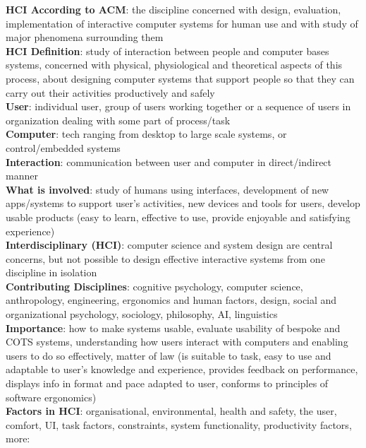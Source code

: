 \documentclass[a4paper]{article}
\begin{document}
    \scriptsize
    \begin{multicols}{2}
        \noindent\textbf{HCI According to ACM}: the discipline concerned with design, evaluation, implementation of interactive computer systems for human use and with study of major phenomena surrounding them\\
        \textbf{HCI Definition}: study of interaction between people and computer bases systems, concerned with physical, physiological and theoretical aspects of this process, about designing computer systems that support people so that they can carry out their activities productively and safely\\
        \textbf{User}: individual user, group of users working together or a sequence of users in organization dealing with some part of process/task\\
        \textbf{Computer}: tech ranging from desktop to large scale systems, or control/embedded systems\\
        \textbf{Interaction}: communication between user and computer in direct/indirect manner\\
        \textbf{What is involved}: study of humans using interfaces, development of new apps/systems to support user's activities, new devices and tools for users, develop usable products (easy to learn, effective to use, provide enjoyable and satisfying experience)\\
        \textbf{Interdisciplinary (HCI)}: computer science and system design are central concerns, but not possible to design effective interactive systems from one discipline in isolation\\
        \textbf{Contributing Disciplines}: cognitive psychology, computer science, anthropology, engineering, ergonomics and human factors, design, social and organizational psychology, sociology, philosophy, AI, linguistics\\
        \textbf{Importance}: how to make systems usable, evaluate usability of bespoke and COTS systems, understanding how users interact with computers and enabling users to do so effectively, matter of law (is suitable to task, easy to use and adaptable to user's knowledge and experience, provides feedback on performance, displays info in format and pace adapted to user, conforms to principles of software ergonomics)\\
        \textbf{Factors in HCI}: organisational, environmental, health and safety, the user, comfort, UI, task factors, constraints, system functionality, productivity factors, more:\\

\end{multicols}
\end{document}
